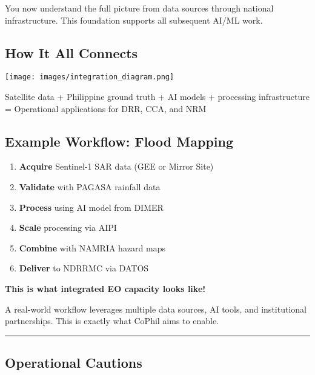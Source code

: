 \documentclass[
  letterpaper,
  DIV=11,
  numbers=noendperiod]{scrartcl}
\providecommand{\tightlist}{%
  \setlength{\itemsep}{0pt}\setlength{\parskip}{0pt}}
\begin{document}
You now understand the full picture from data sources through national
infrastructure. This foundation supports all subsequent AI/ML work.

\subsection{How It All Connects}\label{how-it-all-connects}

\begin{center}
\texttt{[image: images/integration\_diagram.png]}
\end{center}

Satellite data + Philippine ground truth + AI models + processing
infrastructure = Operational applications for DRR, CCA, and NRM

\subsection{Example Workflow: Flood
Mapping}\label{example-workflow-flood-mapping}

\begin{enumerate}
\def\labelenumi{\arabic{enumi}.}
\tightlist
\item
  \textbf{Acquire} Sentinel-1 SAR data (GEE or Mirror Site)
\item
  \textbf{Validate} with PAGASA rainfall data
\item
  \textbf{Process} using AI model from DIMER
\item
  \textbf{Scale} processing via AIPI
\item
  \textbf{Combine} with NAMRIA hazard maps
\item
  \textbf{Deliver} to NDRRMC via DATOS
\end{enumerate}

\textbf{This is what integrated EO capacity looks like!}

A real-world workflow leverages multiple data sources, AI tools, and
institutional partnerships. This is exactly what CoPhil aims to enable.

\begin{center}\rule{0.5\linewidth}{0.5pt}\end{center}

\subsection{Operational Cautions}\label{operational-cautions}
\end{document}
